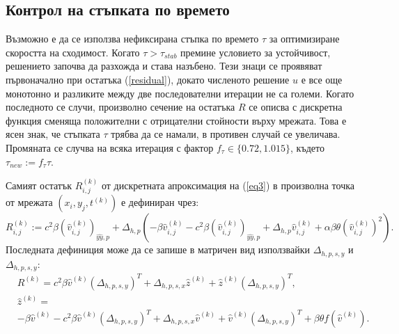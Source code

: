 \documentclass{article}
\newcommand{\rf}[1]{(\ref{#1})}
\begin{document}
\subsection{Контрол на стъпката по времето}
Възможно е да се използва нефиксирана стъпка по времето $\tau$ за оптимизиране скоростта на сходимост. Когато $\tau > \tau_{stab}$ премине условието за устойчивост, решението започва да разхожда и става назъбено. Тези знаци се проявяват първоначално при остатъка \rf{residual}, докато численото решение $u$ е все още монотонно и разликите между две последователни итерации не са големи. Когато последното се случи, произволно сечение на остатъка $R$ се описва с дискретна функция сменяща положителни с отрицателни стойности върху мрежата. Това е ясен знак, че стъпката $\tau$ трябва да се намали, в противен случай се увеличава. Промяната се случва на всяка итерация с фактор $f_{\tau} \in \{0.72, 1.015\}$, където $\tau_{new} := f_{\tau}\tau$.

Самият остатък $R^{(k)}_{i,j}$ от дискретната апроксимация на \rf{eq3} в произволна точка от мрежата $(x_i,y_j,t^{(k)})$ е дефиниран чрез:
\begin{equation}\label{residual}
R_{i,j}^{(k)} := 
c^2\beta (\widehat{v}^{(k)}_{i,j})_{\widehat{yy},p} + \Delta_{h,p}(-\beta \widehat{v}^{(k)}_{i,j} - c^2\beta (\widehat{v}^{(k)}_{i,j})_{\widehat{yy},p} + \Delta_{h,p} \widehat{v}^{(k)}_{i,j} 
+ \alpha \beta \theta (\widehat{v}^{(k)}_{i,j})^2  ).
\end{equation}
Последната дефиниция може да се запише в матричен вид използвайки $\Delta_{h,p,s,y}$ и $\Delta_{h,p,s,y}$:
\begin{align}\label{residualM}
&R^{(k)} = 
c^2\beta \widehat{v}^{(k)}(\Delta_{h,p,s,y})^T + \Delta_{h,p,s,x}  \widehat{z}^{(k)} + \widehat{z}^{(k)}  (\Delta_{h,p,s,y} )^T, \nonumber\\
&\widehat{z}^{(k)}  = \nonumber\\
&-\beta \widehat{v}^{(k)} - c^2\beta \widehat{v}^{(k)}(\Delta_{h,p,s,y})^T + \Delta_{h,p,s,x}  \widehat{v}^{(k)} +  \widehat{v}^{(k)}  (\Delta_{h,p,s,y})^T 
+ \beta \theta f(\widehat{v}^{(k)}).
\end{align}
 
\end{document}

